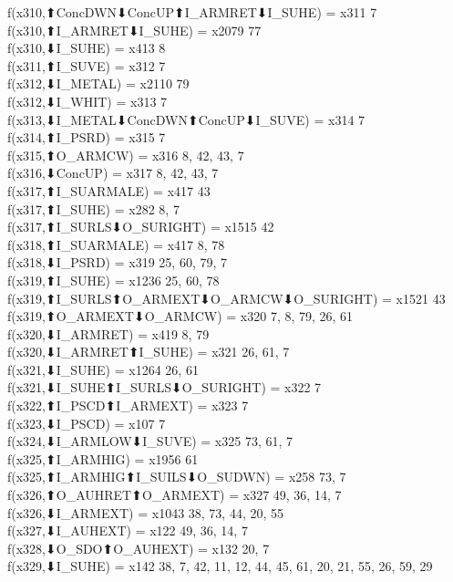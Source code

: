 f(x310,⬆ConcDWN⬇ConcUP⬆I_ARMRET⬇I_SUHE) = x311 {7} \\
f(x310,⬆I_ARMRET⬇I_SUHE) = x2079 {77} \\
f(x310,⬇I_SUHE) = x413 {8} \\
f(x311,⬆I_SUVE) = x312 {7} \\
f(x312,⬇I_METAL) = x2110 {79} \\
f(x312,⬇I_WHIT) = x313 {7} \\
f(x313,⬇I_METAL⬇ConcDWN⬆ConcUP⬇I_SUVE) = x314 {7} \\
f(x314,⬆I_PSRD) = x315 {7} \\
f(x315,⬆O_ARMCW) = x316 {8, 42, 43, 7} \\
f(x316,⬇ConcUP) = x317 {8, 42, 43, 7} \\
f(x317,⬆I_SUARMALE) = x417 {43} \\
f(x317,⬆I_SUHE) = x282 {8, 7} \\
f(x317,⬆I_SURLS⬇O_SURIGHT) = x1515 {42} \\
f(x318,⬆I_SUARMALE) = x417 {8, 78} \\
f(x318,⬇I_PSRD) = x319 {25, 60, 79, 7} \\
f(x319,⬆I_SUHE) = x1236 {25, 60, 78} \\
f(x319,⬆I_SURLS⬆O_ARMEXT⬇O_ARMCW⬇O_SURIGHT) = x1521 {43} \\
f(x319,⬆O_ARMEXT⬇O_ARMCW) = x320 {7, 8, 79, 26, 61} \\
f(x320,⬇I_ARMRET) = x419 {8, 79} \\
f(x320,⬇I_ARMRET⬆I_SUHE) = x321 {26, 61, 7} \\
f(x321,⬇I_SUHE) = x1264 {26, 61} \\
f(x321,⬇I_SUHE⬆I_SURLS⬇O_SURIGHT) = x322 {7} \\
f(x322,⬆I_PSCD⬆I_ARMEXT) = x323 {7} \\
f(x323,⬇I_PSCD) = x107 {7} \\
f(x324,⬇I_ARMLOW⬇I_SUVE) = x325 {73, 61, 7} \\
f(x325,⬆I_ARMHIG) = x1956 {61} \\
f(x325,⬆I_ARMHIG⬆I_SUILS⬇O_SUDWN) = x258 {73, 7} \\
f(x326,⬆O_AUHRET⬆O_ARMEXT) = x327 {49, 36, 14, 7} \\
f(x326,⬇I_ARMEXT) = x1043 {38, 73, 44, 20, 55} \\
f(x327,⬇I_AUHEXT) = x122 {49, 36, 14, 7} \\
f(x328,⬇O_SDO⬆O_AUHEXT) = x132 {20, 7} \\
f(x329,⬇I_SUHE) = x142 {38, 7, 42, 11, 12, 44, 45, 61, 20, 21, 55, 26, 59, 29} \\
